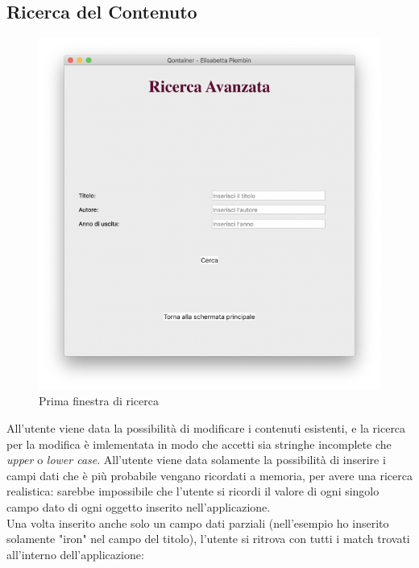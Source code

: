 \documentclass[a4paper,10pt]{article}
\begin{document}
\subsection{Ricerca del Contenuto}
\begin{figure}[H]
	\begin{center}
		\includegraphics[width=\textwidth,keepaspectratio]{immagini/RicercaAvanzata.png}
	\end{center}
	\caption{\label{fig:my-label} Prima finestra di ricerca}
\end{figure}
All'utente viene data la possibilit\`a di modificare i contenuti esistenti, e la ricerca per la modifica \`e imlementata in modo che accetti sia stringhe incomplete che \textit{upper} o \textit{lower case}. All'utente viene data solamente la possibilit\`a di inserire i campi dati che \`e pi\`u probabile vengano ricordati a memoria, per avere una ricerca realistica: sarebbe impossibile che l'utente si ricordi il valore di ogni singolo campo dato di ogni oggetto inserito nell'applicazione.\\
Una volta inserito anche solo un campo dati parziali (nell'esempio ho inserito solamente "iron" nel campo del titolo), l'utente si ritrova con tutti i match trovati all'interno dell'applicazione:
\end{document}
